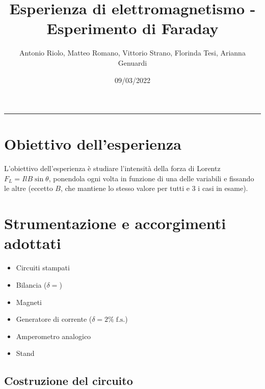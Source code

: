 \documentclass[11pt, a4paper]{article}
\title{Esperienza di elettromagnetismo - Esperimento di Faraday}
\author{Antonio Riolo, Matteo Romano, Vittorio Strano, Florinda Tesi, Arianna Genuardi}
\date{09/03/2022} %
\numberwithin{equation}{section} %
\begin{document}
\maketitle

\tableofcontents

\rule{\textwidth}{1px}

\newpage

    \section{Obiettivo dell'esperienza}

    L'obiettivo dell'esperienza è studiare l'intensità della forza di Lorentz $F_{L} = IlB \sin \theta$, ponendola ogni volta in funzione di una delle variabili e fissando le altre (eccetto $B$, che mantiene lo stesso valore per tutti e 3 i casi in esame).

    \section{Strumentazione e accorgimenti adottati} %

    \begin{itemize}
        \item Circuiti stampati
        \item Bilancia ($\delta =$) %
        \item Magneti 
        \item Generatore di corrente ($\delta = 2\% \; \text{f.s.}$) %
        \item Amperometro analogico
        \item Stand %
    \end{itemize}


    \subsection{Costruzione del circuito}

\end{document}

